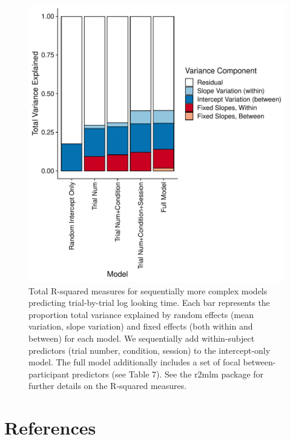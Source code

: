 \documentclass[
  man, donotrepeattitle,floatsintext]{apa6}
\begin{document}
\begin{figure}

{\centering \includegraphics{MB1T_supplement_files/figure-latex/fig16-1} 

}

\caption{Total R-squared measures for sequentially more complex models predicting trial-by-trial log looking time. Each bar represents the proportion total variance explained by random effects (mean variation, slope variation) and fixed effects (both within and between) for each model. We sequentially add within-subject predictors (trial number, condition, session) to the intercept-only model. The full model additionally includes a set of focal between-participant predictors (see Table 7). See the r2mlm package for further details on the R-squared measures.}\label{fig:fig16}
\end{figure}

\newpage

\hypertarget{references}{%
\section{References}\label{references}}

\begingroup
\setlength{\parindent}{-0.5in}
\setlength{\leftskip}{0.5in}
\end{document}
